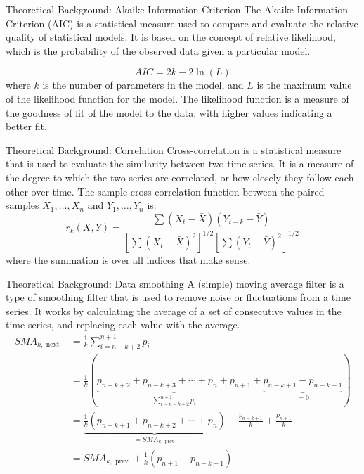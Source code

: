 \documentclass[11pt]{beamer}
\begin{document}
\begin{frame}{Theoretical Background:  Akaike Information Criterion }
The Akaike Information Criterion (AIC) is a statistical measure used to compare and evaluate the relative quality of statistical models. It is based on the concept of relative likelihood, which is the probability of the observed data given a particular model.

$$
AIC = 2k -2\ln(L)
$$
where $k$ is the number of parameters in the model, and $L$ is the maximum value of the likelihood function for the model. The likelihood function is a measure of the goodness of fit of the model to the data, with higher values indicating a better fit.
\end{frame}

\begin{frame}{Theoretical Background:  Correlation}
Cross-correlation is a statistical measure that is used to evaluate the similarity between two time series. It is a measure of the degree to which the two series are correlated, or how closely they follow each other over time.
The sample cross-correlation function between the paired samples $X_1, \ldots, X_n$ and $Y_1, \ldots, Y_n$ is:
$$
r_k(X, Y)=\frac{\sum\left(X_t-\bar{X}\right)\left(Y_{t-k}-\bar{Y}\right)}{\left[\sum\left(X_t-\bar{X}\right)^2\right]^{1 / 2}\left[\sum\left(Y_t-\bar{Y}\right)^2\right]^{1 / 2}}
$$
where the summation is over all indices that make sense.
\end{frame}

\begin{frame}{Theoretical Background:  Data smoothing}
A (simple) moving average filter is a type of smoothing filter that is used to remove noise or fluctuations from a time series. It works by calculating the average of a set of consecutive values in the time series, and replacing each value with the average.
$$\begin{aligned} S M A_{k, \text { next }} & =\frac{1}{k} \sum_{i=n-k+2}^{n+1} p_i \\ & =\frac{1}{k}(\underbrace{p_{n-k+2}+p_{n-k+3}+\cdots+p_n+p_{n+1}}_{\sum_{i=n-k+2}^{n+1} p_i}+\underbrace{p_{n-k+1}-p_{n-k+1}}_{=0}) \\ & =\underbrace{\frac{1}{k}\left(p_{n-k+1}+p_{n-k+2}+\cdots+p_n\right)}_{=S M A_{k, \text { prev }}}-\frac{p_{n-k+1}}{k}+\frac{p_{n+1}}{k} \\ & =S M A_{k, \text { prev }}+\frac{1}{k}\left(p_{n+1}-p_{n-k+1}\right)\end{aligned}$$
\end{frame}
\end{document}
